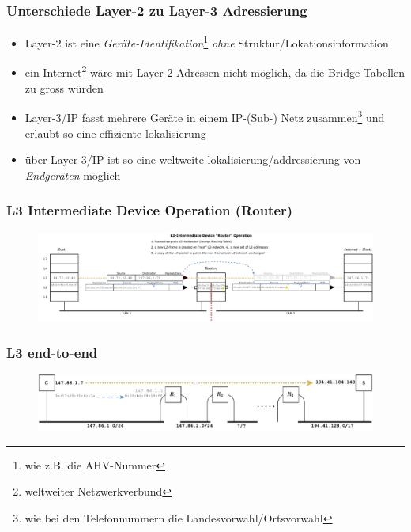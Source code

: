 \documentclass{beamer}
\begin{document}
\begin{frame}
\frametitle{Unterschiede Layer-2 zu Layer-3 Adressierung}
\begin{itemize}
	\item{Layer-2 ist eine {\em Ger\"ate-Identifikation}\footnote{wie z.B. die AHV-Nummer} {\em ohne} Struktur/Lokationsinformation}
	\item{ein Internet\footnote{weltweiter Netzwerkverbund} w\"are mit Layer-2 Adressen nicht m\"oglich, da die Bridge-Tabellen zu gross w\"urden}
	\item{Layer-3/IP fasst mehrere Ger\"ate in einem IP-(Sub-) Netz zusammen\footnote{wie bei den Telefonnummern die Landesvorwahl/Ortsvorwahl} und erlaubt so eine effiziente lokalisierung}
	\item{\"uber Layer-3/IP ist so eine weltweite lokalisierung/addressierung von {\em Endger\"aten} m\"oglich}
\end{itemize}
\end{frame}

\begin{frame}
\frametitle{L3 Intermediate Device Operation (Router)}
\begin{figure}{}
\centering
\includegraphics[width=12cm]{L3_intermediate-device}
\end{figure}
\end{frame}

\begin{frame}
\frametitle{L3 end-to-end}
\begin{figure}
\centering
\includegraphics[width=12cm]{L3_multiple_L2}
\end{figure}
\end{frame}
\end{document}
